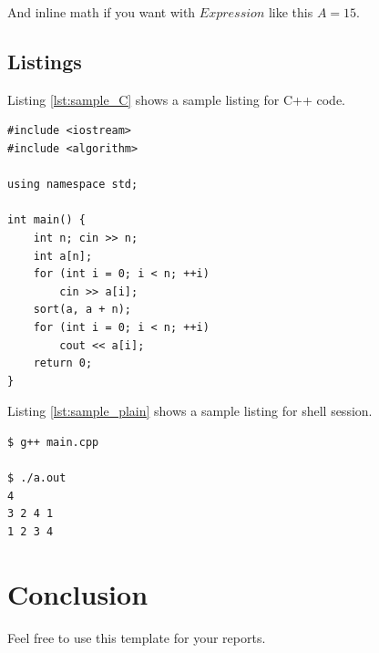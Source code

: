\documentclass[12pt]{article}
\begin{document}
And inline math if you want with \texttt{$Expression$} like this $A = 15$.

\subsection{Listings}
Listing \ref{lst:sample_C} shows a sample listing for C++ code.
\begin{listing}[H]
\begin{verbatim}
#include <iostream>
#include <algorithm>

using namespace std;

int main() {
    int n; cin >> n;
    int a[n];
    for (int i = 0; i < n; ++i)
        cin >> a[i];
    sort(a, a + n);
    for (int i = 0; i < n; ++i)
        cout << a[i];
    return 0;
}
\end{verbatim}
\caption{Sample Code}
\label{lst:sample_C}
\end{listing}

Listing \ref{lst:sample_plain} shows a sample listing for shell session.

\begin{listing}[H]
\begin{verbatim}
$ g++ main.cpp

$ ./a.out
4
3 2 4 1
1 2 3 4

\end{verbatim}
\caption{Sample Output}
\label{lst:sample_plain}
\end{listing}

\clearpage

\section{Conclusion}
Feel free to use this template for your reports.

\clearpage




\clearpage

\listoffigures

\clearpage

\listoftables

\clearpage

\listoflistings
\end{document}
